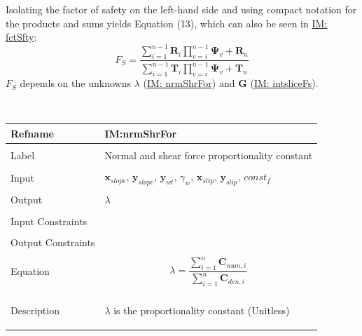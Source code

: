 \documentclass[12pt]{article}
\begin{document}
Isolating the factor of safety on the left-hand side and using compact notation for the products and sums yields Equation (13), which can also be seen in \hyperref[IM:fctSfty]{IM: fctSfty}:
\begin{displaymath}
{F_{S}}=\frac{\displaystyle\sum_{i=1}^{n-1}{{\mathbf{R}}_{i} \displaystyle\prod_{v=i}^{n-1}{{\mathbf{Ψ}}_{v}}}+{\mathbf{R}}_{n}}{\displaystyle\sum_{i=1}^{n-1}{{\mathbf{T}}_{i} \displaystyle\prod_{v=i}^{n-1}{{\mathbf{Ψ}}_{v}}}+{\mathbf{T}}_{n}}
\end{displaymath}
${F_{S}}$ depends on the unknowns $λ$ (\hyperref[IM:nrmShrFor]{IM: nrmShrFor}) and $\mathbf{G}$ (\hyperref[IM:intsliceFs]{IM: intsliceFs}).
\par~

\noindent \begin{minipage}{\textwidth}
          \begin{tabular}{>{\raggedright}p{}>{\raggedright\arraybackslash}p{}}
          \toprule \textbf{Refname} & \textbf{IM:nrmShrFor}
          \label{IM:nrmShrFor}
          \\ \midrule \\
          Label & Normal and shear force proportionality constant
          \\ \midrule \\
          Input & ${\mathbf{x}_{slope}}$, ${\mathbf{y}_{slope}}$, ${\mathbf{y}_{wt}}$, ${γ_{w}}$, ${\mathbf{x}_{slip}}$, ${\mathbf{y}_{slip}}$, $const_f$
          \\ \midrule \\
          Output & $λ$
          \\ \midrule \\
          Input Constraints & 
          \\ \midrule \\
          Output Constraints & 
          \\ \midrule \\
          Equation & \begin{displaymath}
                     λ=\frac{\displaystyle\sum_{i=1}^{n}{{\mathbf{C}_{num,i}}}}{\displaystyle\sum_{i=1}^{n}{{\mathbf{C}_{den,i}}}}
                     \end{displaymath}
          \\ \midrule \\
          Description & \begin{symbDescription}
                        \item{$λ$ is the proportionality constant (Unitless)}

\end{symbDescription}
\end{tabular}
\end{minipage}
\end{document}
